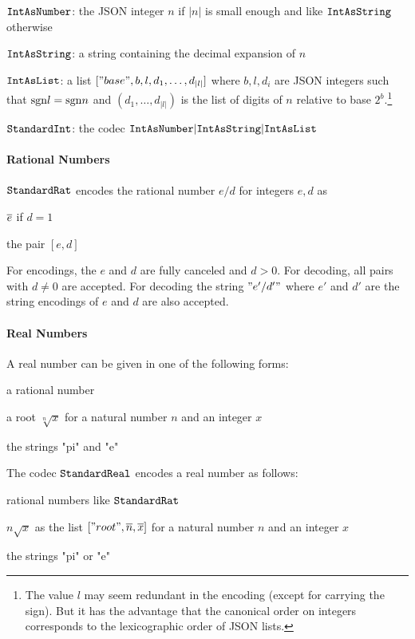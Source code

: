 $\cn{IntAsNumber}$: the JSON integer $n$ if $|n|$ is small enough and like $\cn{IntAsString}$ otherwise

$\cn{IntAsString}$: a string containing the decimal expansion of $n$

$\cn{IntAsList}$: a list $["base",b,l,d_1,\ldots,d_{|l|}]$ where $b,l,d_i$ are JSON integers such that $\sgn l=\sgn n$ and $(d_1,\ldots,d_|l|)$ is the list of digits of $n$ relative to base $2^b$.\footnote{The value $l$ may seem redundant in the encoding (except for carrying the sign). But it has the advantage that the canonical order on integers corresponds to the lexicographic order of JSON lists.}

$\cn{StandardInt}$: the codec $\cunion{\cn{IntAsNumber},\cn{IntAsString},\cn{IntAsList}}$

\paragraph{Rational Numbers}
$\cn{StandardRat}$ encodes the rational number $e/d$ for integers $e,d$ as
\begin{compactitem}
 \item $\ov{e}$ if $d=1$
 \item the pair $[e,d]$
\end{compactitem}
For encodings, the $e$ and $d$ are fully canceled and $d>0$. For decoding, all pairs with $d\neq 0$ are accepted.
For decoding the string $"e'/d'"$ where $e'$ and $d'$ are the string encodings of $e$ and $d$ are also accepted.

\paragraph{Real Numbers}
A real number can be given in one of the following forms:
\begin{compactitem}
 \item a rational number
 \item a root $\sqrt[n]{x}$ for a natural number $n$ and an integer $x$
 \item the strings "pi" and "e"
\end{compactitem}

The codec $\cn{StandardReal}$ encodes a real number as follows:
\begin{compactitem}
 \item rational numbers like $\cn{StandardRat}$
 \item $n\sqrt{x}$ as the list $["root",\ov{n},\ov{x}]$ for a natural number $n$ and an integer $x$
 \item the strings "pi" or "e"
\end{compactitem}


